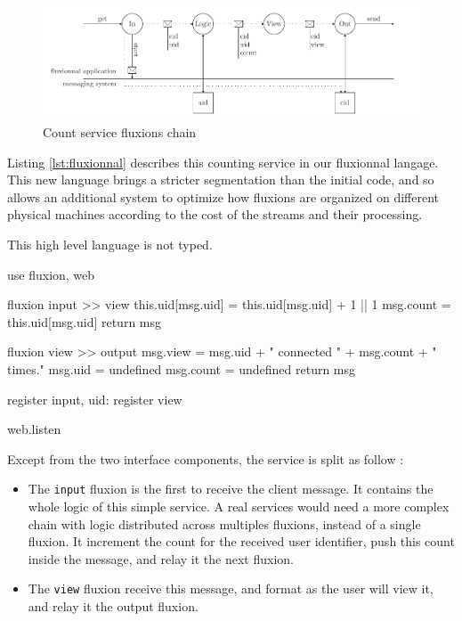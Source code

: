 \begin{figure}[h!]
  \includegraphics[width=\linewidth]{flux.pdf}
  \caption{Count service fluxions chain}
  \label{fig:fluxions}
\end{figure}

Listing \ref{lst:fluxionnal} describes this counting service in our fluxionnal langage.
This new language brings a stricter segmentation than the initial code, and so allows an additional system to optimize how fluxions are organized on different physical machines according to the cost of the streams and their processing. 

This high level language is not typed.

\begin{code}[Javascript, caption={Fluxionnal sample},label={lst:fluxionnal}]
use fluxion, web

fluxion input >> view
  this.uid[msg.uid] = this.uid[msg.uid] + 1 || 1
  msg.count = this.uid[msg.uid]
  return msg

fluxion view >> output
  msg.view = msg.uid + " connected " + msg.count + " times."
  msg.uid = undefined
  msg.count = undefined
  return msg

register input, {uid: {}}
register view

web.listen
\end{code}

Except from the two interface components, the service is split as follow :
\begin{itemize}
  \item The \texttt{input} fluxion is the first to receive the client message.
  It contains the whole logic of this simple service.
  A real services would need a more complex chain with logic distributed across multiples fluxions, instead of a single fluxion.
  It increment the count for the received user identifier, push this count inside the message, and relay it the next fluxion.
  \item The \texttt{view} fluxion receive this message, and format as the user will view it, and relay it the output fluxion.
\end{itemize}